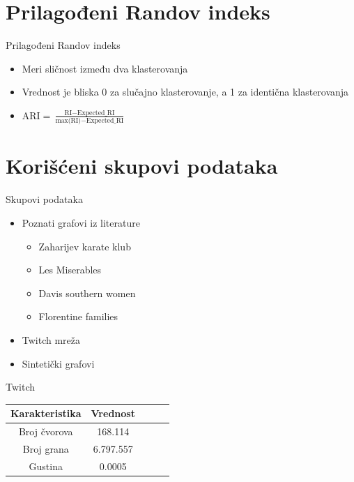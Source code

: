 \documentclass{beamer}
\begin{document}
\section{Prilagođeni Randov indeks}
\begin{frame}{Prilagođeni Randov indeks}
    \begin{itemize}
        \item Meri sličnost između dva klasterovanja
        \item Vrednost je bliska 0 za slučajno klasterovanje, a 1 za identična klasterovanja
        \item $ \text{ARI} = \frac{\text{RI} - \text{Expected\_RI}}{\text{max(RI)} - \text{Expected\_RI}} $
    \end{itemize}
\end{frame}

\section{Korišćeni skupovi podataka}
\begin{frame}{Skupovi podataka}
    \begin{itemize}
        \item Poznati grafovi iz literature 
        \begin{itemize}
            \item Zaharijev karate klub
            \item Les Miserables
            \item Davis southern women
            \item Florentine families
        \end{itemize}
        \item Twitch mreža
        \item Sintetički grafovi 
    \end{itemize}
\end{frame}

\begin{frame}{Twitch}
    \centering
    \begin{tabular}{|c|c|c|c|c|}
        \hline
        \textbf{Karakteristika} & \textbf{Vrednost} \\
        \hline
        Broj čvorova & 168.114 \\
        Broj grana & 6.797.557 \\
        Gustina & 0.0005 \\
        \hline
    \end{tabular}
\end{frame}
\end{document}
